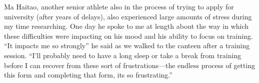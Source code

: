 \begin{CJK}{UTF8}{gbsn}
Ma Haitao, another senior athlete also in the process of trying to apply for university (after years of delays), also experienced large amounts of stress during my time researching.  One day he spoke to me at length about the way in which these difficulties were impacting on his mood and his ability to focus on training. ``It impacts me so strongly'' he said as we walked to the canteen after a training session.  ``I’ll probably need to have a long sleep or take a break from training before I can recover from these sort of frustrations---the endless process of getting this form and completing that form, its so frustrating.''






































































































\end{CJK}
